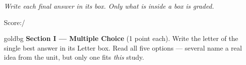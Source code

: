\documentclass[12pt]{article}
\begin{document}
{\small\itshape Write each final answer in its box. Only what is inside a box is graded.}\par

\hfill\small Score:\;\blank{1.3cm}\;/\normalsize
\vspace{0.06in}

\boxguard[10]
\begin{headlinebox}{goldbg}
\small
\textbf{Section I --- Multiple Choice} (1 point each). Write the letter of the single best answer in its Letter box. Read all
five options --- several name a real idea from the unit, but only one fits \emph{this} study.
\end{headlinebox}

\vspace{0.10in}
\end{document}
